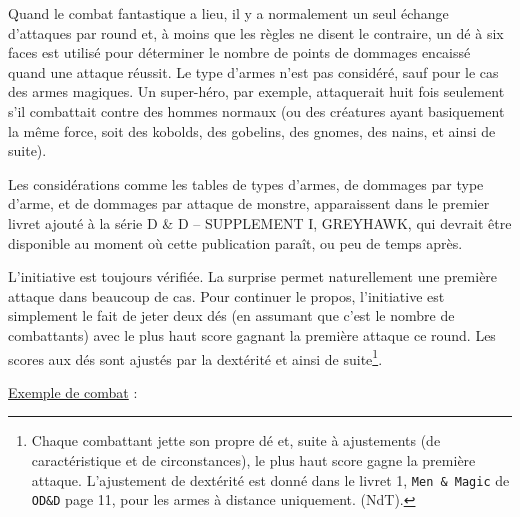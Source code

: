 \medskip

Quand le combat fantastique a lieu, il y a normalement un seul échange d'attaques par round et, à moins que les règles ne disent le contraire, un dé à six faces est utilisé pour déterminer le nombre de points de dommages encaissé quand une attaque réussit. Le type d'armes n'est pas considéré, sauf pour le cas des armes magiques. Un super-héro, par exemple, attaquerait huit fois seulement s'il combattait contre des hommes normaux (ou des créatures ayant basiquement la même force, soit des kobolds, des gobelins, des gnomes, des nains, et ainsi de suite).

\medskip

Les considérations comme les tables de types d'armes, de dommages par type d'arme, et de dommages par attaque de monstre, apparaissent dans le premier livret ajouté à la série D \& D -- SUPPLEMENT I, GREYHAWK, qui devrait être disponible au moment où cette publication paraît, ou peu de temps après.

\medskip

L'initiative est toujours vérifiée. La surprise permet naturellement une première attaque dans beaucoup de cas. Pour continuer le propos, l'initiative est simplement le fait de jeter deux dés (en assumant que c'est le nombre de combattants) avec le plus haut score gagnant la première attaque ce round. Les scores aux dés sont ajustés par la dextérité et ainsi de suite\footnote{
    Chaque combattant jette son propre dé et, suite à ajustements (de caractéristique et de circonstances), le plus haut score gagne la première attaque. L'ajustement de dextérité est donné dans le livret 1, \texttt{Men \& Magic} de \texttt{OD\&D} page 11, pour les armes à distance uniquement. (NdT).
}.

\medskip

\uline{Exemple de combat} :

\medskip

